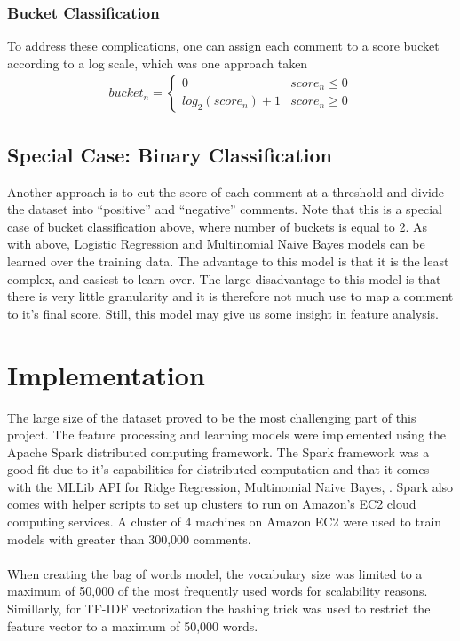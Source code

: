 \documentclass[11pt, twocolumn]{article}
\begin{document}
		\subsubsection{Bucket Classification}
		To address these complications, one can assign each comment to a score bucket according to a log scale, which was one approach taken
		\begin{gather*}
			bucket_n = \begin{cases}
				0 & score_n \le 0 \\
				log_2(score_n) + 1 & score_n \geq 0
				 \end{cases}
		\end{gather*}
	
	
		\subsection{Special Case: Binary Classification}
		Another approach is to cut the score of each comment at a threshold and divide the dataset into ``positive'' and ``negative'' comments. Note that this is a special case of bucket classification above, where number of buckets is equal to 2. As with above, Logistic Regression and Multinomial Naive Bayes models can be learned over the training data. The advantage to this model is that it is the least complex, and easiest to learn over. The large disadvantage to this model is that there is very little granularity and it is therefore not much use to map a comment to it's final score. Still, this model may give us some insight in feature analysis.

\section{Implementation}
	The large size of the dataset proved to be the most challenging part of this project. The feature processing and learning models were implemented using the Apache Spark \cite{spark} distributed computing framework. The Spark framework was a good fit due to it's capabilities for distributed computation and that it comes with the MLLib API for Ridge Regression, Multinomial Naive Bayes, . Spark also comes with helper scripts to set up clusters to run on Amazon's EC2 cloud computing services. A cluster of 4 machines on Amazon EC2 were used to train models with greater than 300,000 comments. \\
	\\
	When creating the bag of words model, the vocabulary size was limited to a maximum of 50,000 of the most frequently used words for scalability reasons. Simillarly, for TF-IDF vectorization the hashing trick \cite{hashing} was used to restrict the feature vector to a maximum of 50,000 words. 
\end{document}
